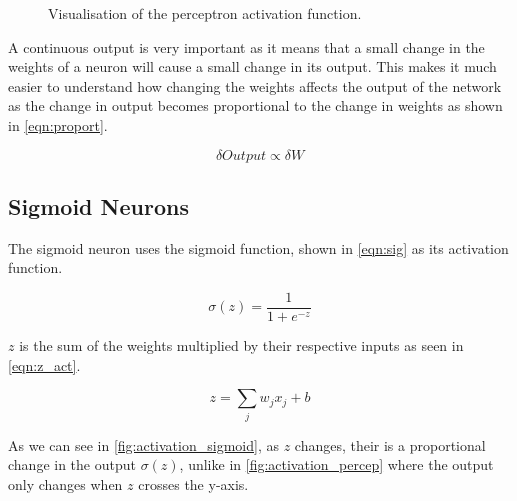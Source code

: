 \begin{figure}
\begin{center}
\caption{Visualisation of the perceptron activation function.}
\label{fig:activation_percep}
\end{center}
\end{figure}

A continuous output is very important as it means that a small change in the weights of a neuron will cause a small change in its output. This makes it much easier to understand how changing the weights affects the output of the network as the change in output becomes proportional to the change in weights as shown in \autoref{eqn:proport}.

\begin{equation} \label{eqn:proport}
	\delta Output \propto \delta W	
\end{equation}  


\subsection{Sigmoid Neurons}

The sigmoid neuron uses the sigmoid function, shown in \autoref{eqn:sig} as its activation function. 

\begin{equation} \label{eqn:sig}
\sigma(z) = \frac{1}{1 + e^{-z}}
\end{equation}

$z$ is the sum of the weights multiplied by their respective inputs as seen in  \autoref{eqn:z_act}.

\begin{equation} \label{eqn:z_act}
z = \sum_{j} w_j x_j + b
\end{equation}

As we can see in \autoref{fig:activation_sigmoid}, as $z$ changes, their is a proportional change in the output $\sigma(z)$, unlike in \autoref{fig:activation_percep} where the output only changes when $z$ crosses the y-axis.

